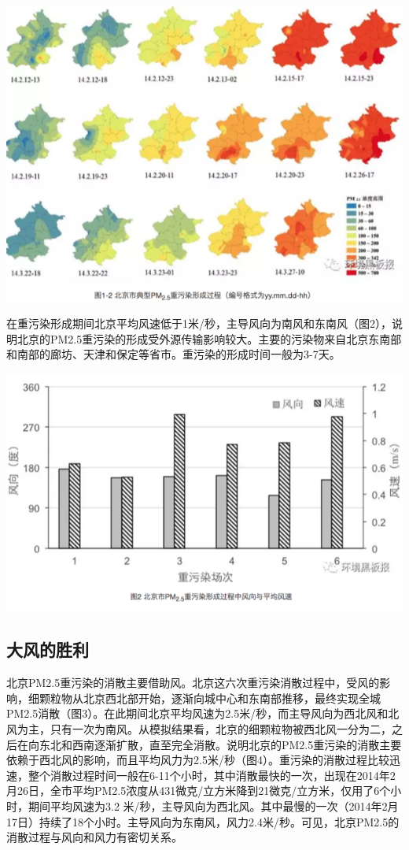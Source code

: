 \documentclass[
]{book}
\begin{document}
\includegraphics[width=8.33in]{images/windhaze2}

在重污染形成期间北京平均风速低于1米/秒，主导风向为南风和东南风（图2），说明北京的PM2.5重污染的形成受外源传输影响较大。主要的污染物来自北京东南部和南部的廊坊、天津和保定等省市。重污染的形成时间一般为3-7天。

\includegraphics[width=8.33in]{images/windhaze3}

\hypertarget{ux5927ux98ceux7684ux80dcux5229}{%
\subsection{大风的胜利}\label{ux5927ux98ceux7684ux80dcux5229}}

北京PM2.5重污染的消散主要借助风。北京这六次重污染消散过程中，受风的影响，细颗粒物从北京西北部开始，逐渐向城中心和东南部推移，最终实现全城PM2.5消散（图3）。在此期间北京平均风速为2.5米/秒，而主导风向为西北风和北风为主，只有一次为南风。从模拟结果看，北京的细颗粒物被西北风一分为二，之后在向东北和西南逐渐扩散，直至完全消散。说明北京的PM2.5重污染的消散主要依赖于西北风的影响，而且平均风力为2.5米/秒（图4）。重污染的消散过程比较迅速，整个消散过程时间一般在6-11个小时，其中消散最快的一次，出现在2014年2月26日，全市平均PM2.5浓度从431微克/立方米降到21微克/立方米，仅用了6个小时，期间平均风速为3.2 米/秒，主导风向为西北风。其中最慢的一次（2014年2月17日）持续了18个小时。主导风向为东南风，风力2.4米/秒。可见，北京PM2.5的消散过程与风向和风力有密切关系。
\end{document}
